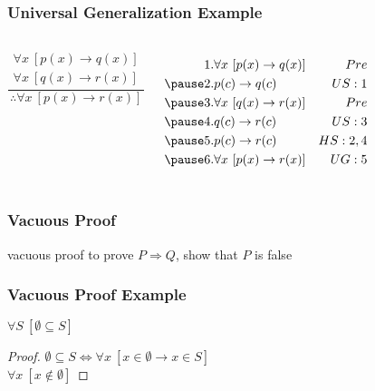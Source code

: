 \documentclass[dvipsnames]{beamer}
\begin{document}
\begin{frame}
  \frametitle{Universal Generalization Example}

  \begin{example}
    \begin{columns}
      \[
      \frac
        {
          \begin{array}{c}
            \forall x~[p(x) \rightarrow q(x)]\\
            \forall x~[q(x) \rightarrow r(x)]
          \end{array}
        }
        {
          \therefore \forall x~[p(x) \rightarrow r(x)]
        }
      \]

      \pause
      \begin{eqnarray*}
        1. & \forall x~[p(x) \rightarrow q(x)] & Pre\\\pause
        2. & p(c) \rightarrow q(c)             & US:1\\\pause
        3. & \forall x~[q(x) \rightarrow r(x)] & Pre\\\pause
        4. & q(c) \rightarrow r(c)             & US:3\\\pause
        5. & p(c) \rightarrow r(c)             & HS:2,4\\\pause
        6. & \forall x~[p(x) \rightarrow r(x)] & UG:5
      \end{eqnarray*}
    \end{columns}
  \end{example}
\end{frame}

\begin{frame}
  \frametitle{Vacuous Proof}

  \begin{block}{vacuous proof}
    to prove $P \Rightarrow Q$, show that $P$ is false
  \end{block}
\end{frame}

\begin{frame}
  \frametitle{Vacuous Proof Example}

  \begin{theorem}
    $\forall S~[\emptyset \subseteq S]$
  \end{theorem}

  \pause
  \begin{proof}
    $\emptyset \subseteq S \Leftrightarrow
      \forall x~[x \in \emptyset \rightarrow x \in S]$\\\pause
    $\forall x~[x \notin \emptyset]$
  \end{proof}
\end{frame}
\end{document}
